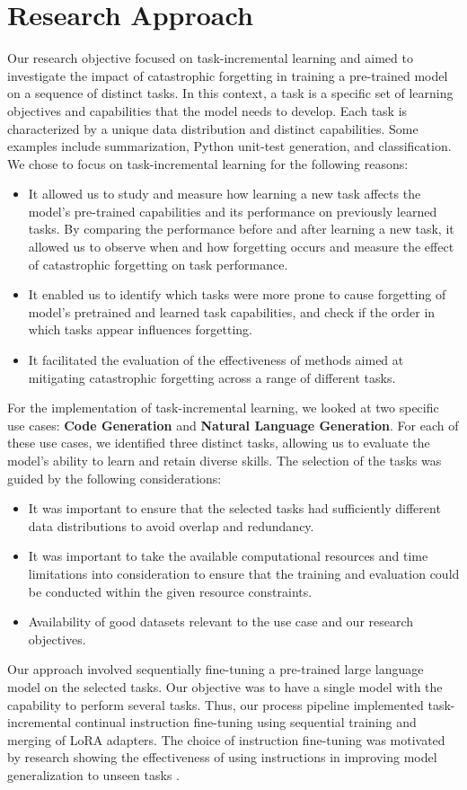 \section{Research Approach} \label{ResearchApproach}
Our research objective focused on task-incremental learning and aimed to investigate the impact of catastrophic forgetting in training a pre-trained model on a sequence of distinct tasks. In this context, a task is a specific set of learning objectives and capabilities that the model needs to develop. Each task is characterized by a unique data distribution and distinct capabilities. Some examples include summarization, Python unit-test generation, and classification. We chose to focus on task-incremental learning for the following reasons:
\begin{itemize}
    \item It allowed us to study and measure how learning a new task affects the model’s pre-trained capabilities and its performance on previously learned tasks. 
    By comparing the performance before and after learning a new task, it allowed us to observe when and how forgetting occurs and measure the effect of catastrophic forgetting on task performance.
    \item It enabled us to identify which tasks were more prone to cause forgetting of model’s pretrained and learned task capabilities, and check if the order in which tasks appear influences forgetting.
    \item It facilitated the evaluation of the effectiveness of methods aimed at mitigating catastrophic forgetting across a range of different tasks.
\end{itemize}
For the implementation of task-incremental learning, we looked at two specific use cases: \textbf{Code Generation} and \textbf{Natural Language Generation}. For each of these use cases, we identified three distinct tasks, allowing us to evaluate the model’s ability to learn and retain diverse skills. The selection of the tasks was guided by the following considerations:
\begin{itemize}
    \item It was important to ensure that the selected tasks had sufficiently different data distributions to avoid overlap and redundancy.
    \item It was important to take the available computational resources and time limitations into consideration to ensure that the training and evaluation could be conducted within the given resource constraints.
    \item Availability of good datasets relevant to the use case and our research objectives.
\end{itemize}
Our approach involved sequentially fine-tuning a pre-trained large language model on the selected tasks. Our objective was to have a single model with the capability to perform several tasks. Thus, our process pipeline implemented task-incremental continual instruction fine-tuning using sequential training and merging of LoRA adapters. The choice of instruction fine-tuning was motivated by research showing the effectiveness of using instructions in improving model generalization to unseen tasks \cite{chung2024scaling}.

